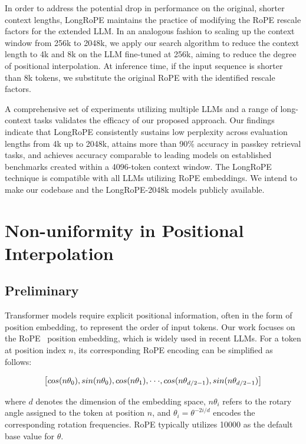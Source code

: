 In order to address the potential drop in performance on the original, shorter context lengths, {LongRoPE} maintains the practice of modifying the RoPE rescale factors for the extended LLM. In an analogous fashion to scaling up the context window from 256k to 2048k, we apply our search algorithm to reduce the context length to 4k and 8k on the LLM fine-tuned at 256k, aiming to reduce the degree of positional interpolation. At inference time, if the input sequence is shorter than 8k tokens, we substitute the original RoPE with the identified rescale factors.

A comprehensive set of experiments utilizing multiple LLMs and a range of long-context tasks validates the efficacy of our proposed approach. Our findings indicate that LongRoPE consistently sustains low perplexity across evaluation lengths from 4k up to 2048k, attains more than 90\% accuracy in passkey retrieval tasks, and achieves accuracy comparable to leading models on established benchmarks created within a 4096-token context window. The LongRoPE technique is compatible with all LLMs utilizing RoPE embeddings. We intend to make our codebase and the LongRoPE-2048k models publicly available.

\section{Non-uniformity in Positional Interpolation}
\label{sec:analysis}

\subsection{Preliminary}

Transformer models require explicit positional information, often in the form of position embedding, to represent the order of input tokens. Our work focuses on the RoPE~\cite{rope} position embedding, which is widely used in recent  LLMs. For a token at position index $n$, its corresponding RoPE encoding can be simplified as follows:

\begin{equation}
		\fontsize{7.8}{7.8} \selectfont
	\label{eq:rope}
	\left[ cos(n\theta_0), sin(n\theta_0), cos(n\theta_1), \cdot\cdot\cdot, cos(n\theta_{d/2-1}), sin(n\theta_{d/2-1}) \right]   
\end{equation}

where $d$ denotes the dimension of the embedding space, 
$n\theta_i$ refers to the rotary angle assigned to the token at position $n$, 
and $\theta_i=\theta^{-2i/d}$ encodes the corresponding rotation frequencies. RoPE typically utilizes 10000 as the default base value for $\theta$.

